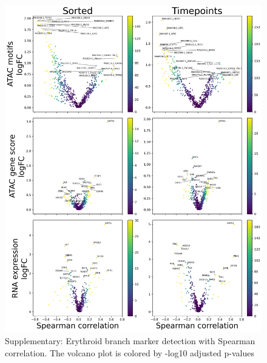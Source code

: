 \documentclass[a4paper]{article}
\begin{document}
\begin{figure}[!htb]
  \centering
  \includegraphics[width=\textwidth]{../figures/hematopoiesis/MKP_40_110_smooth_none_single_branch_volcanos_motifs.png}
  \caption{Supplementary: Erythroid branch marker detection with Spearman correlation. The volcano plot is colored by -log10 adjusted p-values}
\end{figure}
\end{document}
